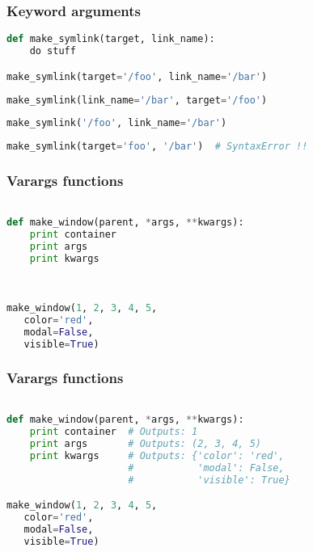\documentclass{beamer}
\begin{document}
\begin{frame}[fragile]
\frametitle{Keyword arguments}

\begin{lstlisting}[language=python]
def make_symlink(target, link_name):
    do stuff

make_symlink(target='/foo', link_name='/bar')
\end{lstlisting}
\pause
\begin{lstlisting}[language=python]
make_symlink(link_name='/bar', target='/foo')
\end{lstlisting}
\pause
\begin{lstlisting}[language=python]
make_symlink('/foo', link_name='/bar')
\end{lstlisting}
\pause
\begin{lstlisting}[language=python]
make_symlink(target='foo', '/bar')  # SyntaxError !!
\end{lstlisting}
\end{frame}


\begin{frame}[fragile]
\frametitle{Varargs functions}

\begin{lstlisting}[language=python]

def make_window(parent, *args, **kwargs):
    print container
    print args     
    print kwargs   
                   
                   

make_window(1, 2, 3, 4, 5,
   color='red',
   modal=False,
   visible=True)

\end{lstlisting}
\end{frame}


\begin{frame}[fragile]
\frametitle{Varargs functions}

\begin{lstlisting}[language=python]

def make_window(parent, *args, **kwargs):
    print container  # Outputs: 1
    print args       # Outputs: (2, 3, 4, 5)
    print kwargs     # Outputs: {'color': 'red', 
                     #           'modal': False,
                     #           'visible': True}

make_window(1, 2, 3, 4, 5,
   color='red',
   modal=False,
   visible=True)

\end{lstlisting}
\end{frame}
\end{document}
